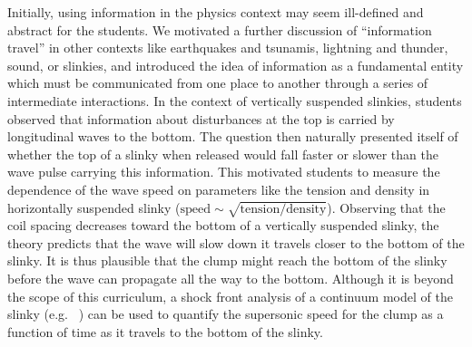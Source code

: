 \documentclass[pre,preprint,superscriptaddress,longbibliography]{revtex4-1}
\newcommand{\eq}[1]{eq.~\eqref{eq:#1}}
\begin{document}
Initially, using information in the physics context may seem ill-defined and abstract for the students.
We motivated a further discussion of ``information travel'' in other contexts like earthquakes and tsunamis, 
lightning and thunder, sound, or slinkies,
and introduced the idea of information as a fundamental entity which must be
communicated from one place to another through a series of intermediate interactions.
In the context of vertically suspended slinkies, students observed that information about disturbances at the top is carried by longitudinal waves to the bottom.  %
The question then naturally presented itself of whether the top of a slinky when released would fall faster or slower than the wave pulse carrying this information. This motivated students to measure the dependence of the wave speed on parameters like the tension and density in horizontally suspended slinky  ($\mathrm{speed}\sim\sqrt{\mathrm{tension}/\mathrm{density}}$).
Observing that the coil spacing decreases toward the bottom of a vertically suspended slinky, the theory predicts that the  wave  will slow down it travels closer to the bottom of the slinky.   %
It is thus plausible
that the clump might reach the bottom of the slinky before the wave can propagate all the way to the bottom.  Although it is beyond the scope of this curriculum, a shock front analysis of a continuum model of the slinky (e.g. ~\cite{unruh2011}) can be used to quantify the supersonic speed for the clump as a function of time as it travels to the bottom of the slinky.
\end{document}
